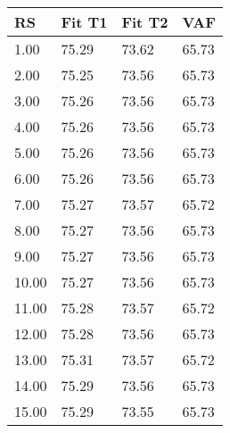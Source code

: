 \begin{tabular}{llll}
RS & Fit T1 & Fit T2 & VAF \\ 
\hline 
 1.00 & 75.29 & 73.62 & 65.73 \\ 
 2.00 & 75.25 & 73.56 & 65.73 \\ 
 3.00 & 75.26 & 73.56 & 65.73 \\ 
 4.00 & 75.26 & 73.56 & 65.73 \\ 
 5.00 & 75.26 & 73.56 & 65.73 \\ 
 6.00 & 75.26 & 73.56 & 65.73 \\ 
 7.00 & 75.27 & 73.57 & 65.72 \\ 
 8.00 & 75.27 & 73.56 & 65.73 \\ 
 9.00 & 75.27 & 73.56 & 65.73 \\ 
10.00 & 75.27 & 73.56 & 65.73 \\ 
11.00 & 75.28 & 73.57 & 65.72 \\ 
12.00 & 75.28 & 73.56 & 65.73 \\ 
13.00 & 75.31 & 73.57 & 65.72 \\ 
14.00 & 75.29 & 73.56 & 65.73 \\ 
15.00 & 75.29 & 73.55 & 65.73 \\ 
\hline 
\end{tabular}